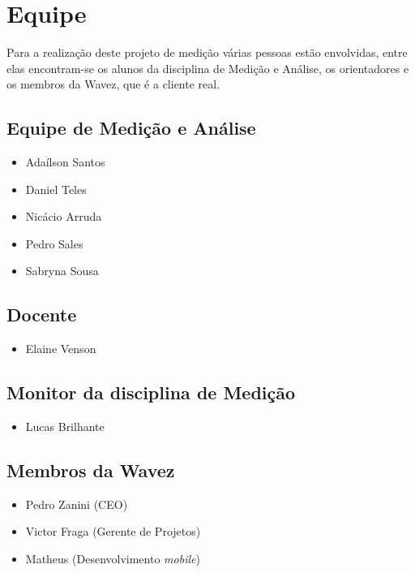 \chapter{Equipe}

Para a realização deste projeto de medição várias pessoas estão envolvidas, entre elas encontram-se os alunos da disciplina de Medição e Análise, os orientadores e os membros da Wavez, que é a cliente real.

\section{Equipe de Medição e Análise}
\begin{itemize}
\item Adaílson Santos
\item Daniel Teles
\item Nicácio Arruda
\item Pedro Sales
\item Sabryna Sousa
\end{itemize}

\section{Docente}
\begin{itemize}
\item Elaine Venson
\end{itemize}

\section{Monitor da disciplina de Medição}
\begin{itemize}
\item Lucas Brilhante
\end{itemize}

\section{Membros da Wavez}
\begin{itemize}
\item Pedro Zanini (CEO)
\item Victor Fraga (Gerente de Projetos)
\item Matheus (Desenvolvimento \textit{mobile})
\end{itemize}

